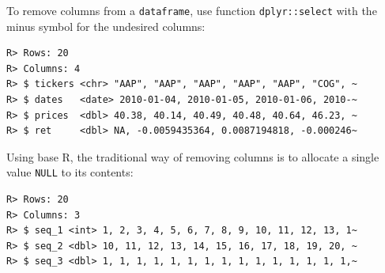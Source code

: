 \documentclass[
  12pt,
]{book}
\newenvironment{Shaded}{\begin{snugshade}}{\end{snugshade}}
\newcommand{\CommentTok}[1]{\textcolor[rgb]{0.37,0.37,0.37}{\textit{#1}}}
\newcommand{\DecValTok}[1]{\textcolor[rgb]{0.06,0.06,0.06}{#1}}
\newcommand{\KeywordTok}[1]{\textcolor[rgb]{0.27,0.27,0.27}{\textbf{#1}}}
\newcommand{\NormalTok}[1]{#1}
\newcommand{\OperatorTok}[1]{\textcolor[rgb]{0.43,0.43,0.43}{\textbf{#1}}}
\newcommand{\OtherTok}[1]{\textcolor[rgb]{0.37,0.37,0.37}{#1}}
\newcommand{\StringTok}[1]{\textcolor[rgb]{0.5,0.5,0.5}{#1}}
\begin{document}
To remove columns from a \texttt{dataframe}, use function \texttt{dplyr::select} with the minus symbol for the undesired columns:

\begin{Shaded}
\end{Shaded}

\begin{verbatim}
R> Rows: 20
R> Columns: 4
R> $ tickers <chr> "AAP", "AAP", "AAP", "AAP", "AAP", "COG", ~
R> $ dates   <date> 2010-01-04, 2010-01-05, 2010-01-06, 2010-~
R> $ prices  <dbl> 40.38, 40.14, 40.49, 40.48, 40.64, 46.23, ~
R> $ ret     <dbl> NA, -0.0059435364, 0.0087194818, -0.000246~
\end{verbatim}

Using base R, the traditional way of removing columns is to allocate a single value \texttt{NULL} to its contents:

\begin{Shaded}
\end{Shaded}

\begin{verbatim}
R> Rows: 20
R> Columns: 3
R> $ seq_1 <int> 1, 2, 3, 4, 5, 6, 7, 8, 9, 10, 11, 12, 13, 1~
R> $ seq_2 <dbl> 10, 11, 12, 13, 14, 15, 16, 17, 18, 19, 20, ~
R> $ seq_3 <dbl> 1, 1, 1, 1, 1, 1, 1, 1, 1, 1, 1, 1, 1, 1, 1,~
\end{verbatim}
\end{document}
